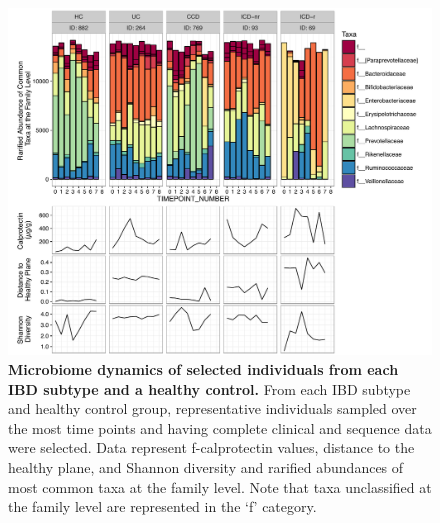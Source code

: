 \begin{figure}[htbp]
\includegraphics[width=\columnwidth]{plane-figures/Fig4}
\caption[Microbiome dynamics of selected individuals from each IBD subtype and a healthy control.]{\textbf{Microbiome dynamics of selected individuals from each IBD subtype and a healthy control.} From each IBD subtype and healthy control group, representative individuals sampled over the most time points and having complete clinical and sequence data were selected. Data represent f-calprotectin values, distance to the healthy plane, and Shannon diversity and rarified abundances of most common taxa at the family level. Note that taxa unclassified at the family level are represented in the ‘f\textunderscore' category.}
\label{plane-fig4}
\end{figure} 

